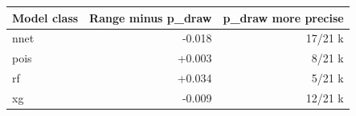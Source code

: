 
\begin{tabular}{lrr}
\toprule
Model class & Range minus p\_draw & p\_draw more precise\\
\midrule
nnet & -0.018 & 17/21 k\\
pois & +0.003 & 8/21 k\\
rf & +0.034 & 5/21 k\\
xg & -0.009 & 12/21 k\\
\bottomrule
\end{tabular}
